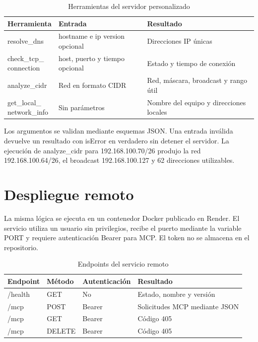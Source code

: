 \documentclass[12pt]{article}
\begin{document}
\begin{table}[H]
\centering
\footnotesize
\begin{tabularx}{\textwidth}{|>{\raggedright\arraybackslash}p{3.6cm}|>{\raggedright\arraybackslash}p{4cm}|X|}
\hline
Herramienta & Entrada & Resultado \\
\hline
resolve\_dns & hostname e ip version opcional & Direcciones IP únicas \\
\hline
\shortstack[l]{check\_tcp\_\\connection} & host, puerto y tiempo opcional & Estado y tiempo de conexión \\
\hline
analyze\_cidr & Red en formato CIDR & Red, máscara, broadcast y rango útil \\
\hline
\shortstack[l]{get\_local\_\\network\_info} & Sin parámetros & Nombre del equipo y direcciones locales \\
\hline
\end{tabularx}
\caption{Herramientas del servidor personalizado}
\end{table}

Los argumentos se validan mediante esquemas JSON. Una entrada inválida devuelve un resultado con isError en verdadero sin detener el servidor. La ejecución de analyze\_cidr para 192.168.100.70/26 produjo la red 192.168.100.64/26, el broadcast 192.168.100.127 y 62 direcciones utilizables.

\section{Despliegue remoto}

La misma lógica se ejecuta en un contenedor Docker publicado en Render. El servicio utiliza un usuario sin privilegios, recibe el puerto mediante la variable PORT y requiere autenticación Bearer para MCP. El token no se almacena en el repositorio.

\begin{table}[H]
\centering
\small
\begin{tabularx}{\textwidth}{|p{2.5cm}|p{2.5cm}|p{3cm}|X|}
\hline
Endpoint & Método & Autenticación & Resultado \\
\hline
/health & GET & No & Estado, nombre y versión \\
\hline
/mcp & POST & Bearer & Solicitudes MCP mediante JSON \\
\hline
/mcp & GET & Bearer & Código 405 \\
\hline
/mcp & DELETE & Bearer & Código 405 \\
\hline
\end{tabularx}
\caption{Endpoints del servicio remoto}
\end{table}
\end{document}
